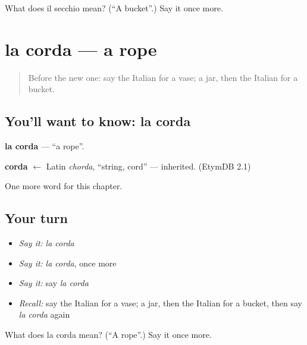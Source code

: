\begin{tcolorbox}[breakable,colback=teal!4,colframe=teal!35!black,title={Before you move on}]
What does il secchio mean? (\textquotedblleft{}A bucket\textquotedblright{}.) Say it once more.
\end{tcolorbox}
\section[la corda]{la corda — a rope}

\label{lesson:IT-C99-corda}



\begin{quote}
Before the new one: say the Italian for a vase; a jar, then the Italian for a bucket.
\end{quote}

\subsection*{You'll want to know: la corda}
\textbf{la corda} — \textquotedblleft{}a rope\textquotedblright{}.

\begin{cousinweb}
\textbf{corda} $\leftarrow$ Latin \emph{chorda}, \textquotedblleft{}string, cord\textquotedblright{} — inherited. (EtymDB 2.1)
\end{cousinweb}

\begin{grammarlens}[title={What you've built}]
One more word for this chapter.
\end{grammarlens}

\subsection*{Your turn}
\begin{itemize}
\raggedright
  \item \emph{Say it:} \emph{la corda}
  \item \emph{Say it:} \emph{la corda}, once more
  \item \emph{Say it:} say \emph{la corda}
  \item \emph{Recall:} say the Italian for a vase; a jar, then the Italian for a bucket, then say \emph{la corda} again
\end{itemize}

\begin{tcolorbox}[breakable,colback=teal!4,colframe=teal!35!black,title={Before you move on}]
What does la corda mean? (\textquotedblleft{}A rope\textquotedblright{}.) Say it once more.
\end{tcolorbox}
